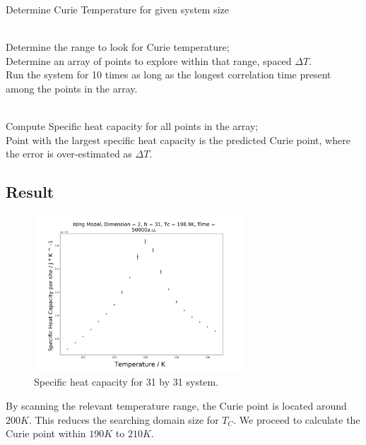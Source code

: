 \documentclass[%
showkeys,
bibnotes,
amsmath,amssymb,
floatfix,
]{revtex4-1}
\begin{document}
\begin{algorithm}[H]
	\caption{Determine Curie Temperature for given system size}
	\label{alg:Curie_point}
	\begin{algorithmic}
		\REQUIRE ~~\\
		
		Determine the range to look for Curie temperature;\\
		Determine an array of points to explore within that range, spaced $\Delta T$.\\
		Run the system for 10 times as long as the longest correlation time present among the points in the array.
		\label{code:equi_mag:initialize}
		
		\ENSURE ~~\\
		
		Compute Specific heat capacity for all points in the array;\\
		\label{code:equi_mag:evolve}
		Point with the largest specific heat capacity is the predicted Curie point, where the error is over-estimated as $\Delta T$.\\
	\end{algorithmic}
\end{algorithm}

\subsection{\label{sec:level2}Result}

\begin{figure}[H] \centering
	\includegraphics[width=0.7\textwidth]{../figures/specific_heat_scan}
	\caption{\label{fig:specific_heat_scan} Specific heat capacity for 31 by 31 system.}
\end{figure}

By scanning the relevant temperature range, the Curie point is located around $200K$. This reduces the searching domain size for $T_C$. We proceed to calculate the Curie point within $190K$ to $210K$.
\end{document}
